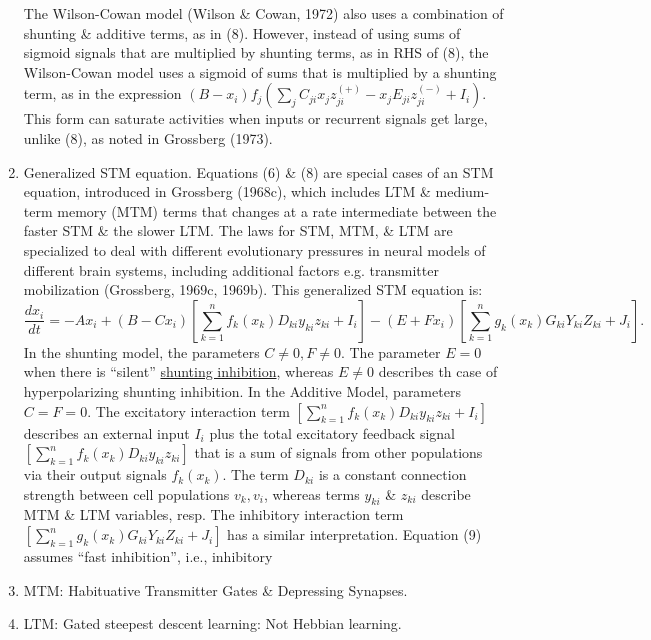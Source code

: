 \documentclass{article}
\begin{document}
\begin{enumerate}
	The Wilson-Cowan model (Wilson \& Cowan, 1972) also uses a combination of shunting \& additive terms, as in (8). However, instead of using sums of sigmoid signals that are multiplied by shunting terms, as in RHS of (8), the Wilson-Cowan model uses a sigmoid of sums that is multiplied by a shunting term, as in the expression $(B - x_i)f_j(\sum_j C_{ji}x_jz_{ji}^{(+)} - x_jE_{ji}z_{ji}^{(-)} + I_i)$. This form can saturate activities when inputs or recurrent signals get large, unlike (8), as noted in Grossberg (1973).
	\item {\sf Generalized STM equation.} Equations (6) \& (8) are special cases of an STM equation, introduced in Grossberg (1968c), which includes LTM \& medium-term memory (MTM) terms that changes at a rate intermediate between the faster STM \& the slower LTM. The laws for STM, MTM, \& LTM are specialized to deal with different evolutionary pressures in neural models of different brain systems, including additional factors e.g. transmitter mobilization (Grossberg, 1969c, 1969b). This generalized STM equation is:
	\begin{equation}
		\frac{dx_i}{dt} = -Ax_i + (B - Cx_i)\left[\sum_{k=1}^n f_k(x_k)D_{ki}y_{ki}z_{ki} + I_i\right] - (E + Fx_i)\left[\sum_{k=1}^n g_k(x_k)G_{ki}Y_{ki}Z_{ki} + J_i\right].
	\end{equation}
	In the shunting model, the parameters $C\ne0,F\ne0$. The parameter $E = 0$ when there is ``silent'' \href{http://www.scholarpedia.org/article/Neural_inhibition}{shunting inhibition}, whereas $E\ne0$ describes th case of hyperpolarizing shunting inhibition. In the Additive Model, parameters $C = F = 0$. The excitatory interaction term $\left[\sum_{k=1}^n f_k(x_k)D_{ki}y_{ki}z_{ki} + I_i\right]$ describes an external input $I_i$ plus the total excitatory feedback signal $\left[\sum_{k=1}^n f_k(x_k)D_{ki}y_{ki}z_{ki}\right]$ that is a sum of signals from other populations via their output signals $f_k(x_k)$. The term $D_{ki}$ is a constant connection strength between cell populations $v_k,v_i$, whereas terms $y_{ki}$ \& $z_{ki}$ describe MTM \& LTM variables, resp. The inhibitory interaction term $\left[\sum_{k=1}^n g_k(x_k)G_{ki}Y_{ki}Z_{ki} + J_i\right]$ has a similar interpretation. Equation (9) assumes ``fast inhibition'', i.e., inhibitory 
	\item {\sf MTM: Habituative Transmitter Gates \& Depressing Synapses.}
	\item {\sf LTM: Gated steepest descent learning: Not Hebbian learning.}
\end{enumerate}
\end{document}
